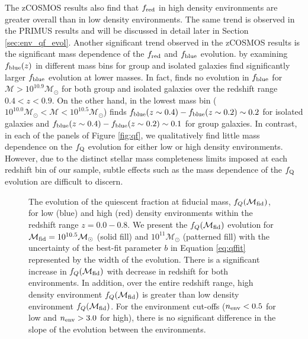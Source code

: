 \documentclass{emulateapj}
\begin{document}
The zCOSMOS results also find that $f_{\rm{red}}$ in high density environments are greater overall than in low density environments. The same trend is observed in the PRIMUS results and will be discussed in detail later in Section \ref{sec:env_qf_evol}. Another significant trend observed in the zCOSMOS results is the significant mass dependence of the $f_{\rm{red}}$ and $f_{\rm{blue}}$ evolution. \cite{Iovino:2010aa} by examining $f_{\rm{blue}}(z)$ in different mass bins for group and isolated galaxies find significantly larger $f_{\rm{blue}}$ evolution at lower masses. In fact, \cite{Iovino:2010aa} finds no evolution in $f_{\rm{blue}}$ for $\mathcal{M} > 10^{10.9} \mathcal{M}_{\odot}$ for both group and isolated galaxies over the redshift range $0.4 < z < 0.9$. On the other hand, in the lowest mass bin ($10^{10.0} \mathcal{M}_{\odot} < \mathcal{M} < 10^{10.5} \mathcal{M}_{\odot}$) \cite{Iovino:2010aa} finds $f_{\rm{blue}}(z \sim 0.4) - f_{\rm{blue}}(z \sim 0.2) \sim 0.2$ for isolated galaxies and  $f_{\rm{blue}}(z \sim 0.4) - f_{\rm{blue}}(z \sim 0.2) \sim 0.1$ for group galaxies. In contrast, in each of the panels of Figure \ref{fig:qf}, we qualitatively find little mass dependence on the $f_{\rm{Q}}$ evolution for either low or high density environments. However, due to the distinct stellar mass completeness limits imposed at each redshift bin of our sample, subtle effects such as the mass dependence of the $f_{\rm{Q}}$ evolution are difficult to discern. 

\begin{figure}
    \begin{center}
        \leavevmode
        \caption{The evolution of the quiescent fraction at fiducial mass, $f_{Q}(\mathcal{M}_{\rm{fid}})$, for low (blue) and high (red) density environments within the redshift range $z = 0.0 - 0.8$. We present the $f_{Q}(\mathcal{M}_{\rm{fid}})$ evolution for $\mathcal{M}_{\rm{fid}} = 10^{10.5} \mathcal{M}_\odot$ (solid fill) and $10^{11} \mathcal{M}_\odot$ (patterned fill) with the uncertainty of the best-fit parameter $b$ in Equation \ref{eq:qffit} represented by the width of the evolution. There is a significant increase in $f_{Q}(\mathcal{M}_{\rm{fid}})$ with decrease in redshift for both environments. In addition, over the entire redshift range, high density environment $f_{Q}(\mathcal{M}_{\rm{fid}})$ is greater than low density environment $f_{Q}(\mathcal{M}_{\rm{fid}})$. For the environment cut-offs ($n_{\rm{env}} < 0.5$ for low and $n_{\rm{env}} > 3.0$ for high), there is no significant difference in the slope of the evolution between the environments.}         \label{fig:qffit}
    \end{center}
\end{figure}
\end{document}
